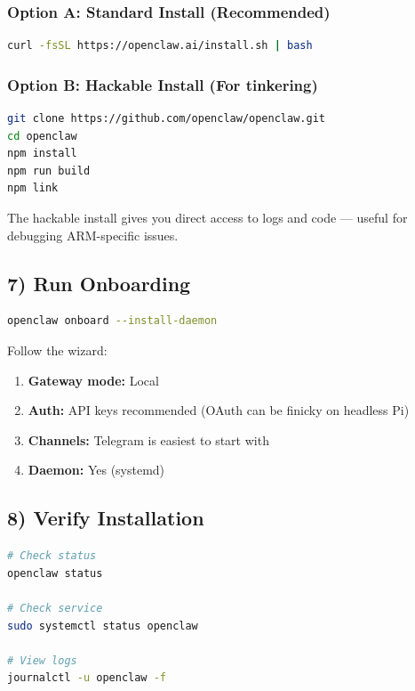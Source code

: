\subsubsection{Option A: Standard Install (Recommended)}


\begin{lstlisting}[language=bash]
curl -fsSL https://openclaw.ai/install.sh | bash
\end{lstlisting}


\subsubsection{Option B: Hackable Install (For tinkering)}


\begin{lstlisting}[language=bash]
git clone https://github.com/openclaw/openclaw.git
cd openclaw
npm install
npm run build
npm link
\end{lstlisting}


The hackable install gives you direct access to logs and code — useful for debugging ARM-specific issues.

\subsection{7) Run Onboarding}


\begin{lstlisting}[language=bash]
openclaw onboard --install-daemon
\end{lstlisting}


Follow the wizard:

\begin{enumerate}
  \item \textbf{Gateway mode:} Local
  \item \textbf{Auth:} API keys recommended (OAuth can be finicky on headless Pi)
  \item \textbf{Channels:} Telegram is easiest to start with
  \item \textbf{Daemon:} Yes (systemd)
\end{enumerate}


\subsection{8) Verify Installation}


\begin{lstlisting}[language=bash]
# Check status
openclaw status

# Check service
sudo systemctl status openclaw

# View logs
journalctl -u openclaw -f
\end{lstlisting}


